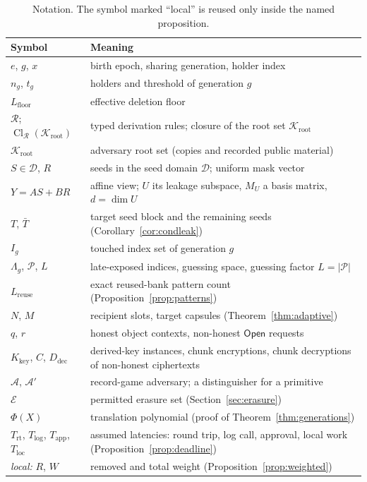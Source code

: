 \documentclass[pdflatex,sn-mathphys-num]{sn-jnl}%
\theoremstyle{plain}
\theoremstyle{definition}
\newcommand{\Cl}{\operatorname{Cl}}
\begin{document}
\begin{table}[htbp]
\caption{Notation. The symbol marked ``local'' is reused only inside the named proposition.}\label{tab:notation}
\centering\footnotesize
\begin{tabularx}{\linewidth}{@{}>{\raggedright\arraybackslash}p{.27\linewidth}Y@{}}\toprule
Symbol & Meaning\\\midrule
$e$, $g$, $x$ & birth epoch, sharing generation, holder index\\
$n_g$, $t_g$ & holders and threshold of generation $g$\\
$L_{\mathrm{floor}}$ & effective deletion floor\\
$\mathcal R$; $\Cl_{\mathcal R}(\mathcal K_{\mathrm{root}})$ & typed derivation rules; closure of the root set $\mathcal K_{\mathrm{root}}$\\
$\mathcal K_{\mathrm{root}}$ & adversary root set (copies and recorded public material)\\
$S\in\mathcal D$, $R$ & seeds in the seed domain $\mathcal D$; uniform mask vector\\
$Y=AS+BR$ & affine view; $U$ its leakage subspace, $M_U$ a basis matrix, $d=\dim U$\\
$T$, $\bar T$ & target seed block and the remaining seeds (Corollary~\ref{cor:condleak})\\
$I_g$ & touched index set of generation $g$\\
$\Lambda_g$, $\mathcal P$, $L$ & late-exposed indices, guessing space, guessing factor $L=|\mathcal P|$\\
$L_{\mathrm{reuse}}$ & exact reused-bank pattern count (Proposition~\ref{prop:patterns})\\
$N$, $M$ & recipient slots, target capsules (Theorem~\ref{thm:adaptive})\\
$q$, $r$ & honest object contexts, non-honest $\mathsf{Open}$ requests\\
$K_{\mathrm{key}}$, $C$, $D_{\mathrm{dec}}$ & derived-key instances, chunk encryptions, chunk decryptions of non-honest ciphertexts\\
$\mathcal A$, $\mathcal A'$ & record-game adversary; a distinguisher for a primitive\\
$\mathcal E$ & permitted erasure set (Section~\ref{sec:erasure})\\
$\Phi(X)$ & translation polynomial (proof of Theorem~\ref{thm:generations})\\
$T_{\mathrm{rt}}$, $T_{\mathrm{log}}$, $T_{\mathrm{app}}$, $T_{\mathrm{loc}}$ & assumed latencies: round trip, log call, approval, local work (Proposition~\ref{prop:deadline})\\
\emph{local:} $R$, $W$ & removed and total weight (Proposition~\ref{prop:weighted})\\\bottomrule
\end{tabularx}
\end{table}
\end{document}
